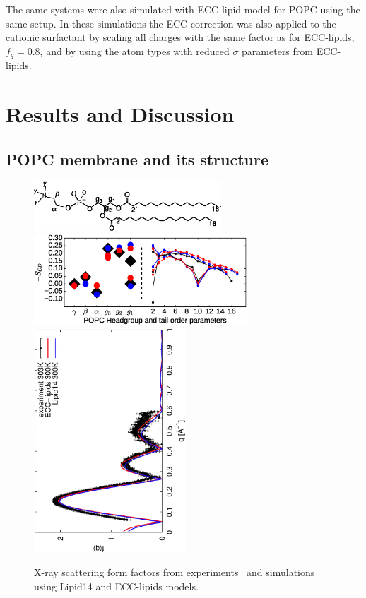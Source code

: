 \documentclass[aip,jcp,twocolumn]{revtex4}
\begin{document}
The same systems were also simulated with ECC-lipid model for POPC using the same setup. 
In these simulations the ECC correction was also applied to the cationic surfactant 
by scaling all charges with the same factor as for ECC-lipids, $f_q=0.8$, 
and by using the atom types with reduced $\sigma$ parameters from ECC-lipids. 


\section{Results and Discussion}

\subsection{POPC membrane and its structure}

\begin{figure}[tbp]
  \centering
  \includegraphics[width=7.0cm]{../Fig/POPCstructure.eps}
  \includegraphics[width=8.0cm]{../Fig/ipython_nb/Order-parameters_exp-L14-ECCL17_q80_sig89.eps}
  \includegraphics[height=8.4cm,angle=-90]{../Fig/form-f_exp-l14-eccl17.eps}
  \caption{\label{simVSexpNOions}
    X-ray scattering form factors from experiments~\cite{Kucerka2011} and simulations using Lipid14 \cite{dickson14} and ECC-lipids models. 
}
\end{figure}
\end{document}
